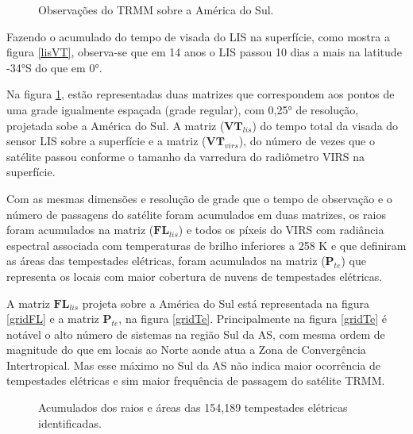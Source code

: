 \begin{figure}[!hb]

\caption{Observações do TRMM sobre a América do Sul.}
\label{gridVT} 
\end{figure} 

Fazendo o acumulado do tempo de visada do LIS na superfície, como mostra a figura \ref{lisVT}, observa-se que em 14 anos o LIS passou 10 dias a mais na latitude -34°S do que em 0°.

Na figura \ref{gridVT}, estão representadas duas matrizes que correspondem aos pontos de uma grade igualmente espaçada (grade regular), com 0,25° de resolução, projetada sobe a América do Sul. A matriz ($\mathbf{VT}_{lis}$) do tempo total da visada do sensor LIS sobre a superfície e a matriz ($\mathbf{VT}_{virs}$), do número de vezes que o satélite passou conforme o tamanho da varredura do radiômetro VIRS na superfície.  


Com as mesmas dimensões e resolução de grade que o tempo de observação e o número de passagens do satélite foram acumulados em duas matrizes, os raios foram acumulados na matriz ($\mathbf{FL}_{lis}$) e todos os píxeis do VIRS com radiância espectral associada com temperaturas de brilho inferiores a 258 K e que definiram as áreas das tempestades elétricas, foram acumulados na matriz ($\mathbf{P}_{te}$) que representa os locais com maior cobertura de nuvens de tempestades elétricas.

A matriz $\mathbf{FL}_{lis}$ projeta sobre a América do Sul está representada na figura \ref{gridFL} e a matriz $\mathbf{P}_{te}$, na figura \ref{gridTe}. Principalmente na figura \ref{gridTe} é notável o alto número de sistemas na região Sul da AS, com mesma ordem de magnitude do que em locais ao Norte aonde atua a Zona de Convergência Intertropical. Mas esse máximo no Sul da AS não indica maior ocorrência de tempestades elétricas e sim maior frequência de passagem do satélite TRMM.

\begin{figure}[!hb]

\caption{Acumulados dos raios e áreas das 154,189 tempestades elétricas identificadas.}
\label{gridSistemas} 
\end{figure} 


